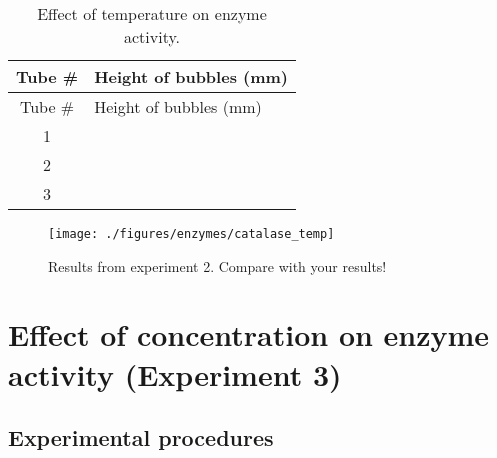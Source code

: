 \begin{longtable}[]{@{}cl@{}}
\caption{\label{tab:temp} Effect of temperature on enzyme
activity.}\tabularnewline
\toprule
Tube \# & Height of bubbles (mm)\tabularnewline
\midrule
\endfirsthead
\toprule
Tube \# & Height of bubbles (mm)\tabularnewline
\midrule
\endhead
1 &\tabularnewline
2 &\tabularnewline
3 &\tabularnewline
\bottomrule
\end{longtable}

\begin{figure}

{\centering \texttt{[image: ./figures/enzymes/catalase\_temp]} 

}

\caption{Results from experiment 2. Compare with your results!}\label{fig:temp}
\end{figure}

\section{Effect of concentration on enzyme activity (Experiment
3)}\label{effect-of-concentration-on-enzyme-activity-experiment-3}

\subsection{Experimental procedures}\label{experimental-procedures-22}

